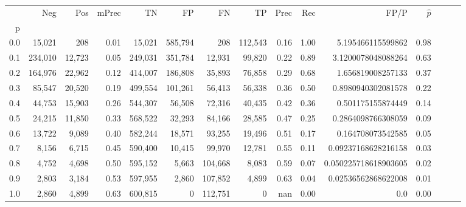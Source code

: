 \begin{tabular}{rrrrrrrrrrrrrrr}
\toprule
{} &      Neg &     Pos & mPrec &       TN &       FP &       FN &       TP &  Prec &   Rec &                  FP/P & $\hat{p}$ \\
p   &          &         &       &          &          &          &          &       &       &                       &           \\
\midrule
0.0 &   15,021 &     208 &  0.01 &   15,021 &  585,794 &      208 &  112,543 &  0.16 &  1.00 &     5.195466115599862 &      0.98 \\
0.1 &  234,010 &  12,723 &  0.05 &  249,031 &  351,784 &   12,931 &   99,820 &  0.22 &  0.89 &    3.1200078048088264 &      0.63 \\
0.2 &  164,976 &  22,962 &  0.12 &  414,007 &  186,808 &   35,893 &   76,858 &  0.29 &  0.68 &     1.656819008257133 &      0.37 \\
0.3 &   85,547 &  20,520 &  0.19 &  499,554 &  101,261 &   56,413 &   56,338 &  0.36 &  0.50 &    0.8980940302081578 &      0.22 \\
0.4 &   44,753 &  15,903 &  0.26 &  544,307 &   56,508 &   72,316 &   40,435 &  0.42 &  0.36 &     0.501175155874449 &      0.14 \\
0.5 &   24,215 &  11,850 &  0.33 &  568,522 &   32,293 &   84,166 &   28,585 &  0.47 &  0.25 &    0.2864098766308059 &      0.09 \\
0.6 &   13,722 &   9,089 &  0.40 &  582,244 &   18,571 &   93,255 &   19,496 &  0.51 &  0.17 &     0.164708073542585 &      0.05 \\
0.7 &    8,156 &   6,715 &  0.45 &  590,400 &   10,415 &   99,970 &   12,781 &  0.55 &  0.11 &   0.09237168628216158 &      0.03 \\
0.8 &    4,752 &   4,698 &  0.50 &  595,152 &    5,663 &  104,668 &    8,083 &  0.59 &  0.07 &  0.050225718618903605 &      0.02 \\
0.9 &    2,803 &   3,184 &  0.53 &  597,955 &    2,860 &  107,852 &    4,899 &  0.63 &  0.04 &   0.02536562868622008 &      0.01 \\
1.0 &    2,860 &   4,899 &  0.63 &  600,815 &        0 &  112,751 &        0 &   nan &  0.00 &                   0.0 &      0.00 \\
\bottomrule
\end{tabular}
